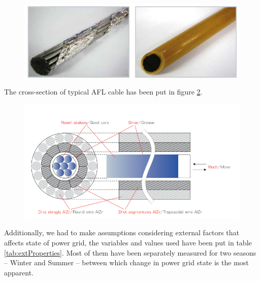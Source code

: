\documentclass[a4paper]{article}
\begin{document}
\begin{figure}[h]
\centering
\includegraphics[scale=0.45]{schemas/img1.png}
\caption{\label{fig:img1}}
\end{figure}

\clearpage

The cross-section of typical AFL cable has been put in figure \ref{fig:img2}.

\begin{figure}[h]
\centering
\includegraphics[scale=0.45]{schemas/img2.png}
\caption{\label{fig:img2}}
\end{figure}

Additionally, we had to make assumptions considering external factors that affects state of power grid, the variables and values used have been put in table \ref{tab:extProperties}. Most of them have been separately measured for two seasons -- Winter and Summer -- between which change in power grid state is the most apparent.\\
\end{document}
